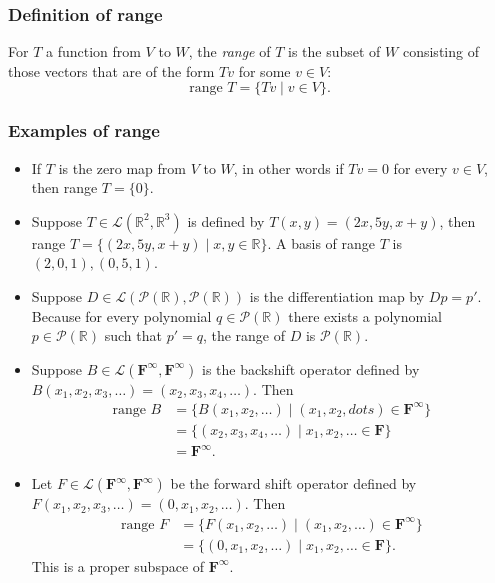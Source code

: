 \documentclass[11pt]{article}
\begin{document}
    \subsubsection{Definition of range}

    For $T$ a function from $V$ to $W$, the \emph{range} of $T$ is the subset of $W$ consisting of those vectors that are of the form $Tv$ for some $v \in V$: \[ \text{range } T = \{Tv \mid v \in V\}. \]

    \subsubsection{Examples of range}

    \begin{itemize}
        \item If $T$ is the zero map from $V$ to $W$, in other words if $Tv = 0$ for every $v \in V$, then range $T = \{0\}$.
        \item Suppose \(T \in \mathcal{L}(\mathbb{R}^2, \mathbb{R}^3)\) is defined by \(T(x,y) = (2x, 5y, x + y)\), then range $T = \{(2x, 5y, x+y) \mid x,y \in \mathbb{R}\}$. A basis of range $T$ is \((2,0,1),(0,5,1)\). 
        \item Suppose \(D \in \mathcal{L}(\mathcal{P}(\mathbb{R}), \mathcal{P}(\mathbb{R}))\) is the differentiation map by \(Dp = p'\). Because for every polynomial \(q \in \mathcal{P}(\mathbb{R})\) there exists a polynomial \(p \in \mathcal{P}(\mathbb{R})\) such that \(p' = q\), the range of $D$ is \(\mathcal{P}(\mathbb{R})\). 
        \item Suppose \(B \in \mathcal{L}(\textbf{F}^{\infty}, \textbf{F}^{\infty})\) is the backshift operator defined by \(B(x_1, x_2, x_3, \dots) = (x_2, x_3, x_4, \dots)\). Then
        \begin{align*}
            \text{range } B &= \{B(x_1, x_2, \dots) \mid (x_1, x_2, dots) \in \textbf{F}^{\infty}\} \\
            &= \{(x_2, x_3, x_4, \dots) \mid x_1, x_2, \dots \in \textbf{F}\} \\
            &= \textbf{F}^{\infty}.
        \end{align*}
        \item Let \(F \in \mathcal{L}(\textbf{F}^{\infty}, \textbf{F}^{\infty})\) be the forward shift operator defined by \(F(x_1, x_2, x_3, \dots) = (0, x_1, x_2, \dots)\). Then 
        \begin{align*}
            \text{range } F &= \{F(x_1, x_2, \dots) \mid (x_1, x_2, \dots) \in \textbf{F}^{\infty}\} \\
            &= \{(0, x_1, x_2, \dots) \mid x_1, x_2, \dots \in \textbf{F}\}.
        \end{align*}
        This is a proper subspace of \(\textbf{F}^{\infty}\). 
    \end{itemize}
\end{document}
